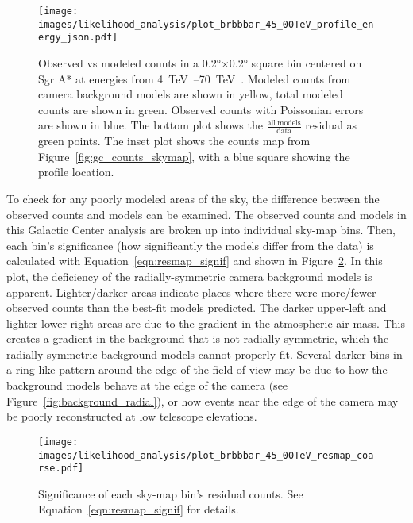 \begin{figure}[t]
  \centering
  \texttt{[image: images/likelihood\_analysis/plot\_brbbbar\_45\_00TeV\_profile\_energy\_json.pdf]}
  \caption[Galactic Center Profile vs Energy]{
    Observed vs modeled counts in a \ang{0.2}$\times$\ang{0.2} square bin centered on Sgr A* at energies from \SIrange{4}{70}{\TeV{}}.
    Modeled counts from camera background models are shown in yellow, total modeled counts are shown in green.
    Observed counts with Poissonian errors are shown in blue.
    The bottom plot shows the $\frac{\mathrm{all\:models}}{\mathrm{data}}$ residual as green points.
    The inset plot shows the counts map from Figure~\ref{fig:gc_counts_skymap}, with a blue square showing the profile location.
    }
  \label{fig:gc_profile_energy}
\end{figure}

To check for any poorly modeled areas of the sky, the difference between the observed counts and models can be examined.
The observed counts and models in this Galactic Center analysis are broken up into individual sky-map bins.
Then, each bin's significance (how significantly the models differ from the data) is calculated with Equation~\ref{eqn:resmap_signif} and shown in Figure~\ref{fig:gc_resmap}.
In this plot, the deficiency of the radially-symmetric camera background models is apparent.
Lighter/darker areas indicate places where there were more/fewer observed counts than the best-fit models predicted.
The darker upper-left and lighter lower-right areas are due to the gradient in the atmospheric air mass.
This creates a gradient in the background that is not radially symmetric, which the radially-symmetric background models cannot properly fit.
Several darker bins in a ring-like pattern around the edge of the field of view may be due to how the background models behave at the edge of the camera (see Figure~\ref{fig:background_radial}), or how events near the edge of the camera may be poorly reconstructed at low telescope elevations.

\begin{figure}[ht]
  \centering
  \texttt{[image: images/likelihood\_analysis/plot\_brbbbar\_45\_00TeV\_resmap\_coarse.pdf]}
  \caption[Galactic Center Residual Map]
  {
    Significance of each sky-map bin's residual counts.
    See Equation~\ref{eqn:resmap_signif} for details.
  }
  \label{fig:gc_resmap}
\end{figure}

